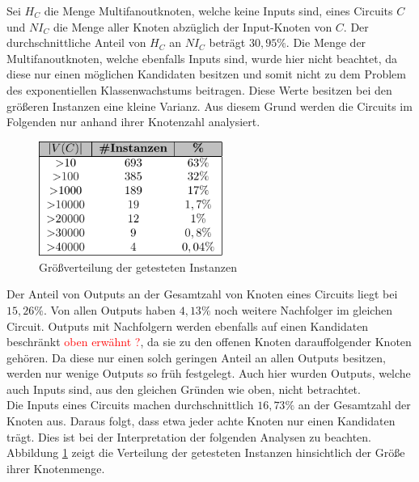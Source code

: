 \documentclass[11pt, a4paper, german]{article}
\begin{document}
Sei $H_C$ die Menge Multifanoutknoten, welche keine Inputs sind, eines Circuits $C$ und $NI_C$ die Menge aller Knoten abz\"uglich der Input-Knoten von $C$. Der durchschnittliche Anteil von $H_C$ an $NI_C$ betr\"agt $30,95\%$. Die Menge der Multifanoutknoten, welche ebenfalls Inputs sind, wurde hier nicht beachtet, da diese nur einen m\"oglichen Kandidaten besitzen und somit nicht zu dem Problem des exponentiellen Klassenwachstums beitragen. Diese Werte besitzen bei den gr\"o{\ss}eren Instanzen eine kleine Varianz. Aus diesem Grund werden die Circuits im Folgenden nur anhand ihrer Knotenzahl analysiert.\\
   \begin{figure}
		\includegraphics[width = 6cm]{pictures/compiled/instance_sizes_distribution_table}
		\caption{Gr\"o\ss verteilung der getesteten Instanzen}
		\label{bild:sizes_table}
	\end{figure}
 Der Anteil von Outputs an der Gesamtzahl von Knoten eines Circuits liegt bei $15,26\%$. Von allen Outputs haben $4,13\%$ noch weitere Nachfolger im gleichen Circuit. Outputs mit Nachfolgern werden ebenfalls auf einen Kandidaten beschr\"ankt \textcolor{red}{oben erw\"ahnt ?}, da sie zu den offenen Knoten darauffolgender Knoten gehören. Da diese nur einen solch geringen Anteil an allen Outputs besitzen, werden nur wenige Outputs so fr\"uh festgelegt. Auch hier wurden Outputs, welche auch Inputs sind, aus den gleichen Gr\"unden wie oben, nicht betrachtet.\\
 Die Inputs eines Circuits machen durchschnittlich $16,73\%$ an der Gesamtzahl der Knoten aus. Daraus folgt, dass etwa jeder achte Knoten nur einen Kandidaten tr\"agt. Dies ist bei der Interpretation der folgenden Analysen zu beachten.\\
 Abbildung \ref{bild:sizes_table} zeigt die Verteilung der getesteten Instanzen hinsichtlich der Größe  ihrer Knotenmenge.
 

 
\end{document}
